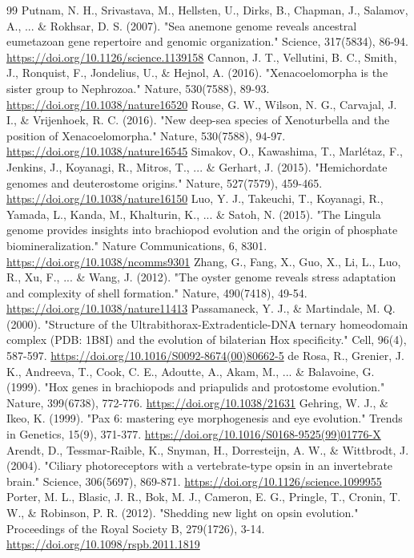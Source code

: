 \documentclass[10pt,letterpaper]{article}
\begin{document}
\begin{thebibliography}{99}
 Putnam, N. H., Srivastava, M., Hellsten, U., Dirks, B., Chapman, J., Salamov, A., ... \& Rokhsar, D. S. (2007). "Sea anemone genome reveals ancestral eumetazoan gene repertoire and genomic organization." Science, 317(5834), 86-94. \url{https://doi.org/10.1126/science.1139158}
 Cannon, J. T., Vellutini, B. C., Smith, J., Ronquist, F., Jondelius, U., \& Hejnol, A. (2016). "Xenacoelomorpha is the sister group to Nephrozoa." Nature, 530(7588), 89-93. \url{https://doi.org/10.1038/nature16520}
 Rouse, G. W., Wilson, N. G., Carvajal, J. I., \& Vrijenhoek, R. C. (2016). "New deep-sea species of Xenoturbella and the position of Xenacoelomorpha." Nature, 530(7588), 94-97. \url{https://doi.org/10.1038/nature16545}
 Simakov, O., Kawashima, T., Marlétaz, F., Jenkins, J., Koyanagi, R., Mitros, T., ... \& Gerhart, J. (2015). "Hemichordate genomes and deuterostome origins." Nature, 527(7579), 459-465. \url{https://doi.org/10.1038/nature16150}
 Luo, Y. J., Takeuchi, T., Koyanagi, R., Yamada, L., Kanda, M., Khalturin, K., ... \& Satoh, N. (2015). "The Lingula genome provides insights into brachiopod evolution and the origin of phosphate biomineralization." Nature Communications, 6, 8301. \url{https://doi.org/10.1038/ncomms9301}
 Zhang, G., Fang, X., Guo, X., Li, L., Luo, R., Xu, F., ... \& Wang, J. (2012). "The oyster genome reveals stress adaptation and complexity of shell formation." Nature, 490(7418), 49-54. \url{https://doi.org/10.1038/nature11413}
 Passamaneck, Y. J., \& Martindale, M. Q. (2000). "Structure of the Ultrabithorax-Extradenticle-DNA ternary homeodomain complex (PDB: 1B8I) and the evolution of bilaterian Hox specificity." Cell, 96(4), 587-597. \url{https://doi.org/10.1016/S0092-8674(00)80662-5}
 de Rosa, R., Grenier, J. K., Andreeva, T., Cook, C. E., Adoutte, A., Akam, M., ... \& Balavoine, G. (1999). "Hox genes in brachiopods and priapulids and protostome evolution." Nature, 399(6738), 772-776. \url{https://doi.org/10.1038/21631}
 Gehring, W. J., \& Ikeo, K. (1999). "Pax 6: mastering eye morphogenesis and eye evolution." Trends in Genetics, 15(9), 371-377. \url{https://doi.org/10.1016/S0168-9525(99)01776-X}
 Arendt, D., Tessmar-Raible, K., Snyman, H., Dorresteijn, A. W., \& Wittbrodt, J. (2004). "Ciliary photoreceptors with a vertebrate-type opsin in an invertebrate brain." Science, 306(5697), 869-871. \url{https://doi.org/10.1126/science.1099955}
 Porter, M. L., Blasic, J. R., Bok, M. J., Cameron, E. G., Pringle, T., Cronin, T. W., \& Robinson, P. R. (2012). "Shedding new light on opsin evolution." Proceedings of the Royal Society B, 279(1726), 3-14. \url{https://doi.org/10.1098/rspb.2011.1819}

\end{thebibliography}
\end{document}
